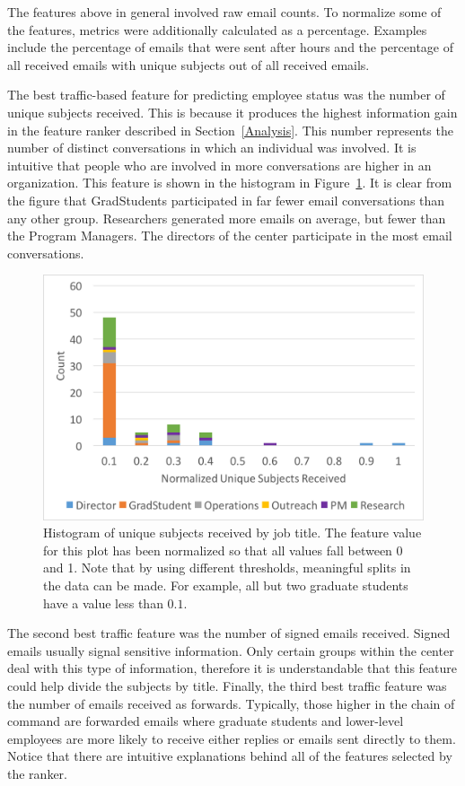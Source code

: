 \documentclass[10pt,twocolumn,conference]{IEEEtran}
\begin{document}
The features above in general involved raw email counts.  To normalize some of the features, metrics were additionally calculated as a percentage. Examples include the percentage of emails that were sent after hours and the percentage of all received emails with unique subjects out of all received emails.

The best traffic-based feature for predicting employee status was the number of unique subjects received.  This is because it produces the highest information gain in the feature ranker described in Section~\ref{Analysis}.  This number represents the number of distinct conversations in which an individual was involved.  It is intuitive that people who are involved in more conversations are higher in an organization.  This feature is shown in the histogram in Figure~\ref{fig:traffic_ex_hist}.  It is clear from the figure that GradStudents participated in far fewer email conversations than any other group.  Researchers generated more emails on average, but fewer than the Program Managers.  The directors of the center participate in the most email conversations. 
\begin{figure}[t]
    \centering
        \includegraphics[width=\columnwidth,trim={1mm 20mm 1mm 2mm},clip]{Unique_subjects_rec_hist}
        \caption{Histogram of unique subjects received by job title.  The feature value for this plot has been normalized so that all values fall between 0 and 1.  Note that by using different thresholds, meaningful splits in the data can be made.  For example, all but two graduate students have a value less than $0.1$.}
        \label{fig:traffic_ex_hist}
\end{figure}

The second best traffic feature was the number of signed emails received.  Signed emails usually signal sensitive information.  Only certain groups within the center deal with this type of information, therefore it is understandable that this feature could help divide the subjects by title.  Finally, the third best traffic feature was the number of emails received as forwards.  Typically, those higher in the chain of command are forwarded emails where graduate students and lower-level employees are more likely to receive either replies or emails sent directly to them.  Notice that there are intuitive explanations behind all of the features selected by the ranker.
\end{document}
